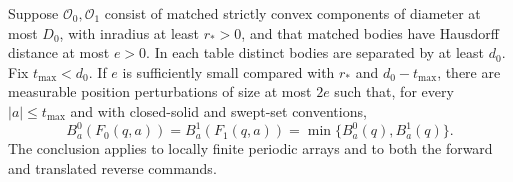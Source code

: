 \begin{lemma}\label{lem:common-response}
Suppose $\mathcal O_0,\mathcal O_1$ consist of matched strictly convex
components of diameter at most $D_0$, with inradius at least $r_*>0$,
and that matched bodies have Hausdorff distance at most $e>0$.
In each table distinct bodies are separated by at least $d_0$.
Fix $t_{\max}<d_0$. If $e$ is sufficiently small compared with
$r_*$ and $d_0-t_{\max}$, there are measurable position perturbations
of size at most $2e$ such that, for every $|a|\le t_{\max}$ and
with closed-solid and swept-set conventions,
\begin{equation}\label{eq:common-response}
 B^0_a(F_0(q,a))=B^1_a(F_1(q,a))
                    =\min\{B^0_a(q),B^1_a(q)\}.
\end{equation}
The conclusion applies to locally finite periodic arrays and to both
the forward and translated reverse commands.
\end{lemma}
